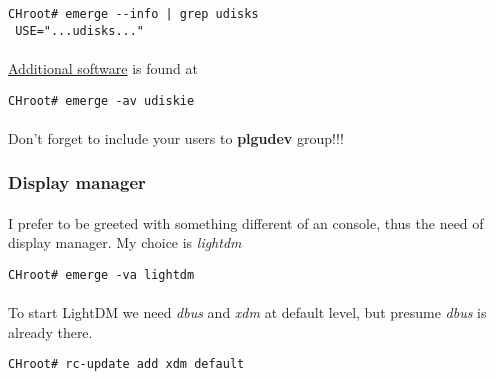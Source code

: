 \documentclass[10pt,a4paper]{article}
\begin{document}
                    \begin{lstlisting}[style=BashInputCHRoot]
 CHroot# emerge --info | grep udisks
 USE="...udisks..."
                    \end{lstlisting}

                    \paragraph{} \href{https://wiki.gentoo.org/wiki/Udisks#Emerge}{Additional software} is found at

                    \begin{lstlisting}[style=BashInputCHRoot]
 CHroot# emerge -av udiskie
                    \end{lstlisting}

                    \paragraph{} Don't forget to include your users to \textbf{plgudev} group!!!

                \newpage
                \subsubsection{Display manager}

                    \paragraph{} I prefer to be greeted with something different of an console, thus the need of display manager. My choice is \textit{lightdm}

                    \begin{lstlisting}[style=BashInputCHRoot]
 CHroot# emerge -va lightdm
                    \end{lstlisting}

                    \paragraph{} To start LightDM we need \textit{dbus} and \textit{xdm} at default level, but presume \textit{dbus} is already there.

                    \begin{lstlisting}[style=BashInputCHRoot]
 CHroot# rc-update add xdm default
                    \end{lstlisting}
\end{document}
